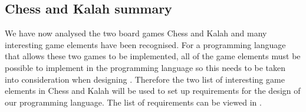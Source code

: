 \subsection{Chess and Kalah summary}
\label{subsec:summery}

We have now analysed the two board games Chess and Kalah and many interesting
game elements have been recognised. For a programming language that allows
these two games to be implemented, all of the game elements must be possible to
implement in the programming language so this needs to be taken into
consideration when designing \productname{}. Therefore the two list of
interesting game elements in Chess and Kalah will be used to set up requirements
for the design of our programming language. The list of requirements can be
viewed in .


 
